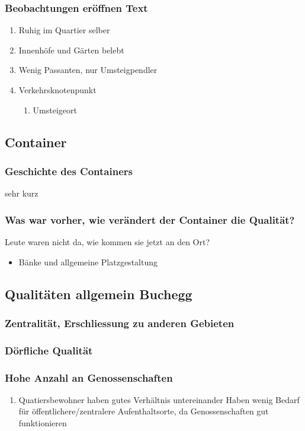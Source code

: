 \documentclass[a4paper,ngerman,11pt]{scrartcl}
\begin{document}
\subsubsection{Beobachtungen eröffnen Text}
\label{sec-3-1-1}
\begin{enumerate}
\item Ruhig im Quartier selber
\label{sec-3-1-1-1}
\item Innenhöfe und Gärten belebt
\label{sec-3-1-1-2}
\item Wenig Passanten, nur Umsteigpendler
\label{sec-3-1-1-3}
\item Verkehrsknotenpunkt
\label{sec-3-1-1-4}
\begin{enumerate}
\item Umsteigeort
\label{sec-3-1-1-4-1}
\end{enumerate}
\end{enumerate}

\subsection{Container}
\label{sec-3-2}
\subsubsection{Geschichte des Containers}
\label{sec-3-2-1}
sehr kurz
\subsubsection{Was war vorher, wie verändert der Container die Qualität?}
\label{sec-3-2-2}
Leute waren nicht da, wie kommen sie jetzt an den Ort?
\begin{itemize}
\item Bänke und allgemeine Platzgestaltung
\end{itemize}

\subsection{Qualitäten allgemein Buchegg}
\label{sec-3-3}
\subsubsection{Zentralität, Erschliessung zu anderen Gebieten}
\label{sec-3-3-1}
\subsubsection{Dörfliche Qualität}
\label{sec-3-3-2}
\subsubsection{Hohe Anzahl an Genossenschaften}
\label{sec-3-3-3}
\begin{enumerate}
\item Quatiersbewohner haben gutes Verhältnis untereinander
\label{sec-3-3-3-1}
Haben wenig Bedarf für öffentlichere/zentralere Aufenthaltsorte, da
Genossenschaften gut funktionieren
\end{enumerate}
\end{document}
